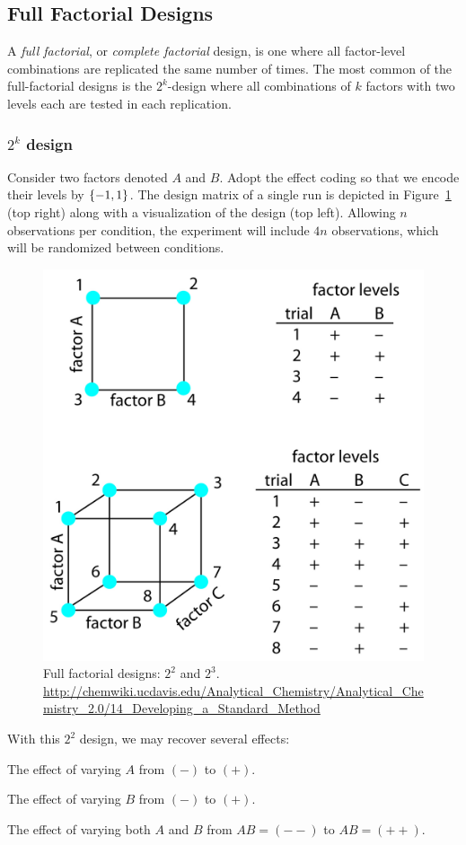 \subsection{Full Factorial Designs}
A \emph{full factorial}, or \emph{complete factorial} design, is one where all factor-level combinations are replicated the same number of times.
The most common of the full-factorial designs is the $2^k$-design where all combinations of $k$ factors with two levels each are tested in each replication.



\subsubsection{$2^k$ design}
Consider two factors denoted $A$ and $B$.
Adopt the effect coding so that we encode their levels by $\{ -1,1 \}$.
The design matrix of a single run is depicted in Figure~\ref{fig:full_factorial} (top right) along with a visualization of the design (top left).
Allowing $n$ observations per condition, the experiment will include $4n$ observations, which will be randomized between conditions.

\begin{figure}[ht]
\centering
\includegraphics[width=0.7\linewidth, height=0.3\textheight]{art/full_factorial}
\caption[Full Factorial Design]{Full factorial designs: $2^2$ and $2^3$. \newline \url{http://chemwiki.ucdavis.edu/Analytical_Chemistry/Analytical_Chemistry_2.0/14_Developing_a_Standard_Method}}
\label{fig:full_factorial}
\end{figure}
With this $2^2$ design, we may recover several effects:
\begin{description}
\item [Main effect of A] The effect of varying $A$ from $(-)$ to $(+)$.
\item [Main effect of B] The effect of varying $B$ from $(-)$ to $(+)$.
\item The effect of varying both $A$ and $B$ from $AB=(--)$ to $AB=(++)$. 
\end{description}

